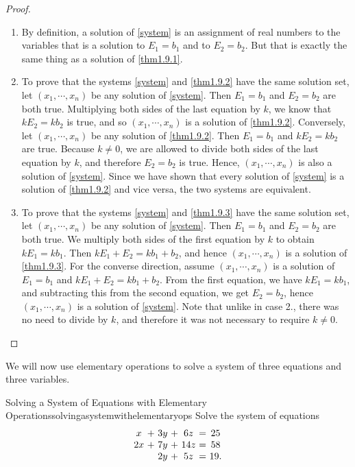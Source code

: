 \begin{proof} 
\begin{enumerate}
\item By definition, a solution of \eqref{system} is an assignment of
  real numbers to the variables that is a solution to $E_1=b_1$ and to
  $E_2=b_2$. But that is exactly the same thing as a solution of
  \eqref{thm1.9.1}.

\item To prove that the systems \eqref{system} and \eqref{thm1.9.2}
  have the same solution set, let $\left(x_{1},\cdots,x_{n}\right)$ be
  any solution of \eqref{system}. Then $E_1=b_1$ and $E_2=b_2$ are
  both true. Multiplying both sides of the last equation by $k$, we
  know that $kE_2=kb_2$ is true, and so
  $\left(x_{1},\cdots,x_{n}\right)$ is a solution of
  \eqref{thm1.9.2}. Conversely, let $\left(x_{1},\cdots,x_{n}\right)$
  be any solution of \eqref{thm1.9.2}.  Then $E_1=b_1$ and $kE_2=kb_2$
  are true. Because $k\neq 0$, we are allowed to divide both sides of
  the last equation by $k$, and therefore $E_2=b_2$ is true. Hence,
  $\left(x_{1},\cdots,x_{n}\right)$ is also a solution of
  \eqref{system}. Since we have shown that every solution of
  \eqref{system}  is a solution of \eqref{thm1.9.2} and vice versa,
  the two systems are equivalent.

\item To prove that the systems \eqref{system} and \eqref{thm1.9.3}
  have the same solution set, let $\left(x_{1},\cdots,x_{n}\right)$ be
  any solution of \eqref{system}. Then $E_1=b_1$ and $E_2=b_2$ are
  both true. We multiply both sides of the first equation by $k$ to
  obtain $kE_1=kb_1$. Then $kE_1+E_2 = kb_1+b_2$, and hence
  $\left(x_{1},\cdots,x_{n}\right)$ is a solution of
  \eqref{thm1.9.3}. For the converse direction, assume
  $\left(x_{1},\cdots,x_{n}\right)$ is a solution of $E_1=b_1$ and
  $kE_1+E_2 = kb_1+b_2$. From the first equation, we have $kE_1=kb_1$,
  and subtracting this from the second equation, we get $E_2=b_2$,
  hence $\left(x_{1},\cdots,x_{n}\right)$ is a solution of
  \eqref{system}. Note that unlike in case 2., there was no need to
  divide by $k$, and therefore it was not necessary to require $k\neq 0$.
\end{enumerate}
\end{proof}

We will now use elementary operations to solve a system of three
equations and three variables.

\begin{example}{Solving a System of Equations with Elementary Operations}{solvingasystemwithelementaryops}
Solve the system of equations
\begin{equation*}
\begin{array}{c@{~}c@{~}c@{~}c@{~}c@{~}c@{~}c}
x&+&3y&+&6z&=&25 \\
2x&+&7y&+&14z&=&58 \\
&&2y&+&5z&=&19.
\end{array}
\label{solvingasystem1}
\end{equation*}
\end{example}


